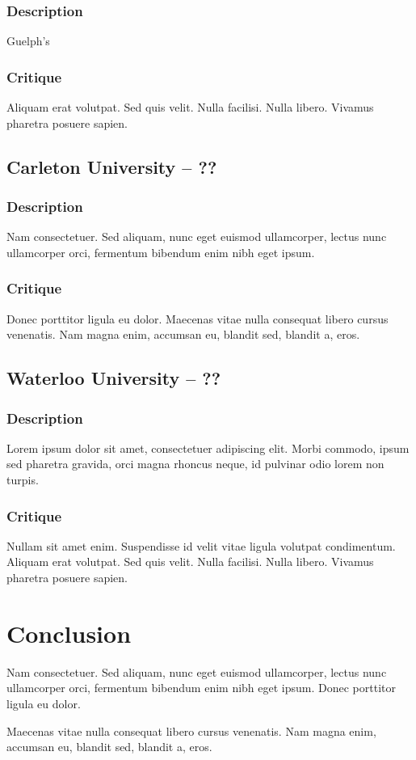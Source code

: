 \documentclass[10pt]{article}
\begin{document}
\begin{multicols}{2}
\subsubsection*{Description}
Guelph's

\subsubsection*{Critique}
Aliquam erat volutpat. Sed quis velit. Nulla facilisi. Nulla libero. Vivamus pharetra posuere sapien. 

\subsection*{Carleton University -- ??}
\subsubsection*{Description}
Nam consectetuer. Sed aliquam, nunc eget euismod ullamcorper, lectus nunc ullamcorper orci, fermentum bibendum enim nibh eget ipsum. 

\subsubsection*{Critique}
Donec porttitor ligula eu dolor. Maecenas vitae nulla consequat libero cursus venenatis. Nam magna enim, accumsan eu, blandit sed, blandit a, eros.

\subsection*{Waterloo University -- ??}
\subsubsection*{Description}
Lorem ipsum dolor sit amet, consectetuer adipiscing elit. Morbi commodo, ipsum sed pharetra gravida, orci magna rhoncus neque, id pulvinar odio lorem non turpis. 

\subsubsection*{Critique}
Nullam sit amet enim. Suspendisse id velit vitae ligula volutpat condimentum. Aliquam erat volutpat. Sed quis velit. Nulla facilisi. Nulla libero. Vivamus pharetra posuere sapien. 

\section*{Conclusion}
Nam consectetuer. Sed aliquam, nunc eget euismod ullamcorper, lectus nunc ullamcorper orci, fermentum bibendum enim nibh eget ipsum. Donec porttitor ligula eu dolor. 

Maecenas vitae nulla consequat libero cursus venenatis. Nam magna enim, accumsan eu, blandit sed, blandit a, eros.

\end{multicols}
\end{document}
